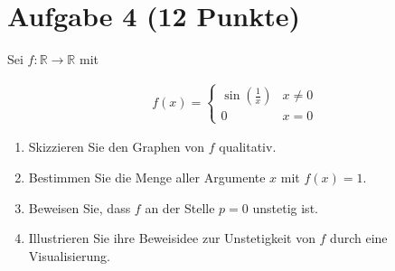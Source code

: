 \documentclass[a4paper]{article}
\newcommand*{\R}{\mathbb R}
\begin{document}
\section{Aufgabe 4 (12 Punkte)}

Sei $f:\R\to\R$ mit

\begin{align}
  f(x) = \begin{cases} \sin\left(\frac 1x\right) & x \neq 0 \\ 0 & x = 0 \end{cases}
\end{align}

\begin{enumerate}
  \item Skizzieren Sie den Graphen von $f$ qualitativ.
  \item Bestimmen Sie die Menge aller Argumente $x$ mit $f(x)=1$.
  \item Beweisen Sie, dass $f$ an der Stelle $p=0$ unstetig ist.
  \item Illustrieren Sie ihre Beweisidee zur Unstetigkeit von $f$ durch eine Visualisierung.
\end{enumerate}
\end{document}

